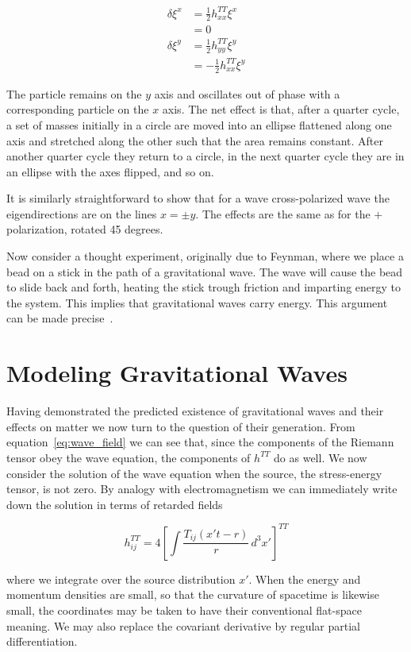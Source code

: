 \begin{align*}
\delta \xi^x &= \frac{1}{2} h^{TT}_{xx} \xi^x \\
&= 0 \\
\delta \xi^y &= \frac{1}{2} h^{TT}_{yy} \xi^y \\
&= - \frac{1}{2} h^{TT}_{xx} \xi^y
\end{align*}

The particle remains on the $y$ axis and oscillates out of phase with
a corresponding particle on the $x$ axis.  The net effect is that,
after a quarter cycle, a set of masses initially in a circle are moved
into an ellipse flattened along one axis and stretched along the other
such that the area remains constant.  After another quarter cycle they
return to a circle, in the next quarter cycle they are in an ellipse
with the axes flipped, and so on.

It is similarly straightforward to show that for a wave
cross-polarized wave the eigendirections are on the lines $x=\pm y$.
The effects are the same as for the $+$ polarization, rotated 45
degrees.

Now consider a thought experiment, originally due to Feynman, where we
place a bead on a stick in the path of a gravitational wave.  The wave
will cause the bead to slide back and forth, heating the stick trough
friction and imparting energy to the system.  This implies that
gravitational waves carry energy.  This argument can be made
precise~\cite{RevModPhys.29.509}.

\section{Modeling Gravitational Waves}

Having demonstrated the predicted existence of gravitational waves and
their effects on matter we now turn to the question of their
generation.  From equation~\ref{eq:wave_field} we can see that, since
the components of the Riemann tensor obey the wave equation, the
components of $h^{TT}$ do as well.  We now consider the solution of
the wave equation when the source, the stress-energy tensor, is not
zero.  By analogy with electromagnetism we can immediately write down
the solution in terms of retarded fields

\begin{equation}
\label{eq:h_from_t}
h^{TT}_{ij} = 4 \left[ \int \frac{T_{ij}(x' t-r)}{r}\, d^3 x'
\right]^{TT}
\end{equation}

where we integrate over the source distribution $x'$.  When the energy
and momentum densities are small, so that the curvature of spacetime
is likewise small, the coordinates may be taken to have their
conventional flat-space meaning.  We may also replace the covariant
derivative by regular partial differentiation.

